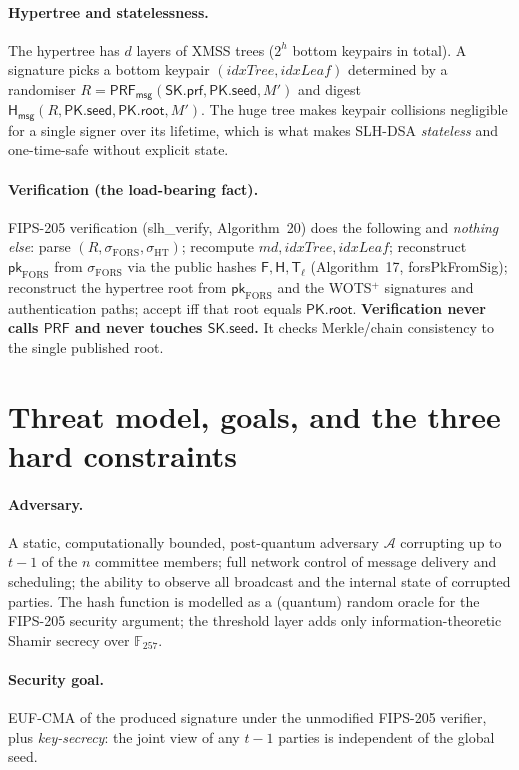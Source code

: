 \documentclass[11pt,a4paper]{article}
\newcommand{\PRF}{\mathsf{PRF}}
\newcommand{\PRFmsg}{\mathsf{PRF}_{\mathsf{msg}}}
\newcommand{\Hmsg}{\mathsf{H}_{\mathsf{msg}}}
\newcommand{\Fhash}{\mathsf{F}}
\newcommand{\Hhash}{\mathsf{H}}
\newcommand{\Tl}{\mathsf{T}_{\ell}}
\newcommand{\skseed}{\mathsf{SK.seed}}
\newcommand{\skprf}{\mathsf{SK.prf}}
\newcommand{\pkseed}{\mathsf{PK.seed}}
\newcommand{\pkroot}{\mathsf{PK.root}}
\newcommand{\GF}{\mathbb{F}}
\newcommand{\adv}{\mathcal{A}}
\begin{document}
\paragraph{Hypertree and statelessness.}
The hypertree has $d$ layers of XMSS trees ($2^h$ bottom keypairs in total). A
signature picks a bottom keypair $(\mathit{idxTree}, \mathit{idxLeaf})$ determined
by a randomiser $R = \PRFmsg(\skprf, \pkseed, M')$ and digest
$\Hmsg(R, \pkseed, \pkroot, M')$. The huge tree makes keypair collisions negligible
for a single signer over its lifetime, which is what makes SLH-DSA \emph{stateless}
and one-time-safe without explicit state.

\paragraph{Verification (the load-bearing fact).}
FIPS-205 verification (\textsf{slh\_verify}, Algorithm~20) does the following and
\emph{nothing else}: parse $(R, \sigma_{\mathrm{FORS}}, \sigma_{\mathrm{HT}})$;
recompute $md, \mathit{idxTree}, \mathit{idxLeaf}$; reconstruct
$\mathsf{pk}_{\mathrm{FORS}}$ from $\sigma_{\mathrm{FORS}}$ via the public hashes
$\Fhash,\Hhash,\Tl$ (Algorithm~17, \textsf{forsPkFromSig}); reconstruct the
hypertree root from $\mathsf{pk}_{\mathrm{FORS}}$ and the WOTS$^+$ signatures and
authentication paths; accept iff that root equals $\pkroot$. \textbf{Verification
never calls $\PRF$ and never touches $\skseed$.} It checks Merkle/chain consistency
to the single published root.

\section{Threat model, goals, and the three hard constraints}
\label{sec:model}

\paragraph{Adversary.} A static, computationally bounded, post-quantum adversary
$\adv$ corrupting up to $t-1$ of the $n$ committee members; full network control of
message delivery and scheduling; the ability to observe all broadcast and the
internal state of corrupted parties. The hash function is modelled as a (quantum)
random oracle for the FIPS-205 security argument; the threshold layer adds only
information-theoretic Shamir secrecy over $\GF_{257}$.

\paragraph{Security goal.} EUF-CMA of the produced signature under the unmodified
FIPS-205 verifier, plus \emph{key-secrecy}: the joint view of any $t-1$ parties is
independent of the global seed.
\end{document}

